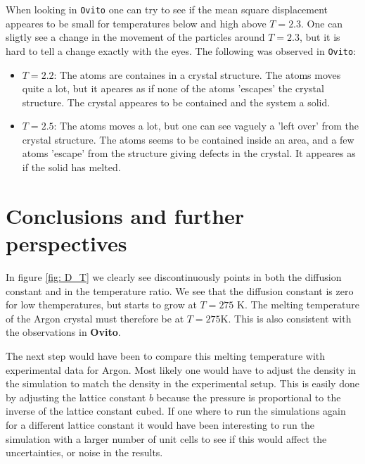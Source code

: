 \documentclass[11pt,a4wide]{article}
\begin{document}
When looking in \texttt{Ovito} one can try to see if the mean square displacement appeares to be small for temperatures below and high above $T=2.3$. One can sligtly see a change in the movement of the particles around $T=2.3$, but it is hard to tell a change exactly with the eyes. The following was observed in \texttt{Ovito}:
\begin{itemize}
\item $T=2.2$: The atoms are containes in a crystal structure. The atoms moves quite a lot, but it apeares as if none of the atoms 'escapes' the crystal structure. The crystal appeares to be contained and the system a solid. 
\item $T=2.5$: The atoms moves a lot, but one can see vaguely a 'left over' from the crystal structure. The atoms seems to be contained inside an area, and a few atoms 'escape' from the structure giving defects in the crystal. It appeares as if the solid has melted. 
\end{itemize}

\newpage
\section{Conclusions and further perspectives}
In figure \ref{fig: D_T} we clearly see discontinuously points in both the diffusion constant and in the temperature ratio. We see that the diffusion constant is zero for low themperatures, but starts to grow at $T = 275$ K. The melting temperature of the Argon crystal must therefore be at $T = 275$K. This is also consistent with the observations in \textbf{Ovito}. 

The next step would have been to compare this melting temperature with experimental data for Argon. Most likely one would have to adjust the density in the simulation to match the density in the experimental setup. This is easily done by adjusting the lattice constant $b$ because the pressure is proportional to the inverse of the lattice constant cubed. If one where to run the simulations again for a different lattice constant it would have been interesting to run the simulation with a larger number of unit cells to see if this would affect the uncertainties, or noise in the results. 
\end{document}
